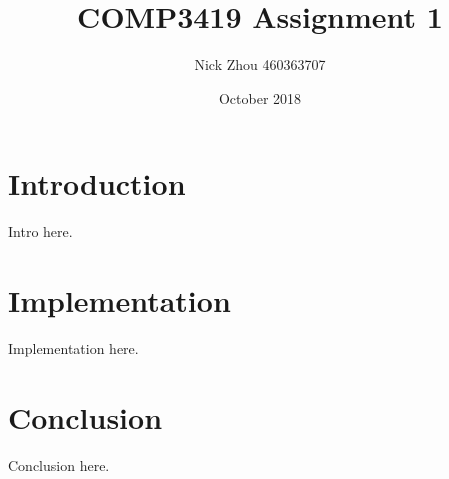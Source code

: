 \documentclass[12pt,a4paper]{article}
\begin{document}
    \begin{titlepage}
        \title{COMP3419 Assignment 1}
        \author{Nick Zhou 460363707}
        \date{October 2018}
        \maketitle
    \end{titlepage}

    \begin{tableofcontents}
        \tableofcontents
        \pagebreak
    \end{tableofcontents}

    \section{Introduction}
    Intro here.

    \section{Implementation}
    Implementation here.

    \section{Conclusion}
    Conclusion here.
\end{document}
